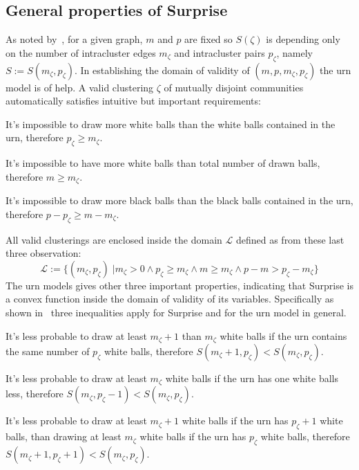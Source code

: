 \subsection{General properties of Surprise}
As noted by~\cite{fleck2014}, for a given graph, $m$ and $p$ are fixed so $S(\zeta)$ is depending only on the number of intracluster edges $m_\zeta$ and intracluster pairs $p_\zeta$, namely $S:=S(m_\zeta,p_\zeta)$.
In establishing the domain of validity of $(m,p,m_\zeta,p_\zeta)$ the urn model is of help. A valid clustering $\zeta$ of mutually disjoint communities automatically satisfies intuitive but important requirements:
\begin{obs}
It's impossible to draw more white balls than the white balls contained in the urn, therefore $p_\zeta \geq m_\zeta$.
\end{obs}
\begin{obs}
It's impossible to have more white balls than total number of drawn balls, therefore $m\geq m_\zeta$.
\end{obs}
\begin{obs}
It's impossible to draw more black balls than the black balls contained in the urn, therefore $p-p_\zeta \geq m-m_\zeta$.
\end{obs}
All valid clusterings are enclosed inside the domain $\mathcal{L}$ defined as from these last three observation:
\begin{equation}
\mathcal{L} := \{ ( m_\zeta,p_\zeta) \; | m_\zeta > 0 \land p_\zeta \geq m_\zeta \land m \geq m_\zeta \land p-m > p_\zeta - m_\zeta \}
\end{equation}
The urn models gives other three important properties, indicating that Surprise is a convex function inside the domain of validity of its variables. Specifically as shown in~\cite{fleck2014} three inequalities apply for Surprise and for the urn model in general.
\begin{props}\label{prop:prop1}
\label{list:surprise_properties} It's less probable to draw at least $m_\zeta+1$ than $m_\zeta$ white balls if the urn contains the same number of $p_\zeta$ white balls, therefore $S(m_\zeta+1,p_\zeta) < S(m_\zeta,p_\zeta)$.
\end{props}
\begin{props}\label{prop:prop2}
It's less probable to draw at least $m_\zeta$ white balls if the urn has one white balls less, therefore $S(m_\zeta,p_\zeta-1) < S(m_\zeta,p_\zeta)$.
\end{props}
\begin{props}\label{prop:prop3}
It's less probable to draw at least $m_\zeta+1$ white balls if the urn has $p_\zeta+1$ white balls, than drawing at least $m_\zeta$ white balls if the urn has $p_\zeta$ white balls, therefore $S(m_\zeta+1,p_\zeta+1) < S(m_\zeta,p_\zeta)$.
\end{props}
